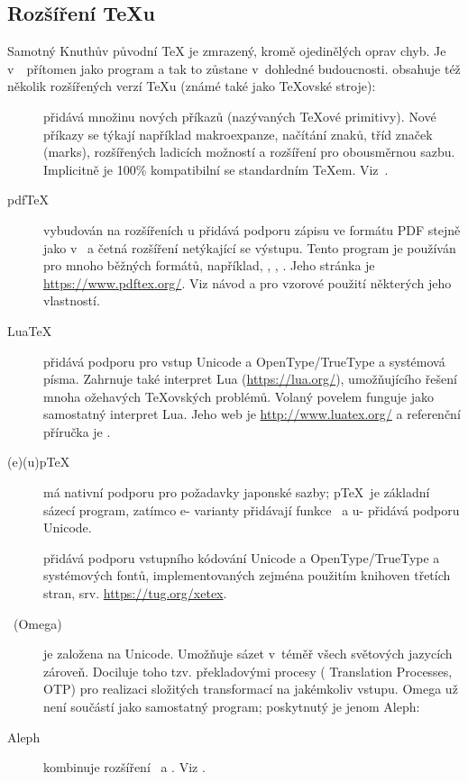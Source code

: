 \documentclass[\classoptions,slovak,english,czech]{\classname}
\begin{document}
\subsection{Rozšíření \protect\TeX{}u}
\label{sec:tex-extensions}

Samotný Knuthův původní \TeX{} je zmrazený, kromě ojedinělých oprav chyb.
Je v~\TL\ přítomen jako program  a tak to zůstane
v~dohledné budoucnosti. \TL{} obsahuje též několik rozšířených verzí 
\TeX{}u (známé také jako \TeX{}ovské stroje):

\begin{description}

\item [\eTeX] přidává množinu nových
příkazů (nazývaných \TeX{}ové primitivy).
\label{text:etex}
Nové příkazy se týkají například makroexpanze, načítání znaků,
tříd značek (marks), rozšířených ladicích možností
a rozšíření \TeXXeT{} pro obousměrnou sazbu. Implicitně
je \eTeX{} 100\% kompatibilní se standardním \TeX{}em.
Viz~. 

\item [pdf\TeX] vybudován na rozšířeních \eTeX{}u přidává podporu 
zápisu ve formátu PDF stejně jako v~\dvi{} a 
četná rozšíření netýkající se výstupu. 
Tento program je používán pro mnoho běžných formátů, 
například, , , .
Jeho stránka je \url{https://www.pdftex.org/}. Viz 
návod 
a 
pro vzorové použití některých jeho vlastností.  

\item [Lua\TeX] přidává podporu pro vstup Unicode a OpenType\slash TrueType
a systémová písma. Zahrnuje také interpret Lua
(\url{https://lua.org/}), umožňujícího řešení mnoha ožehavých \TeX ovských
problémů. Volaný povelem  funguje jako samostatný
interpret Lua. Jeho web je \url{http://www.luatex.org/} a
referenční příručka je . 

\item [(e)(u)p\TeX] má nativní podporu pro požadavky japonské sazby; 
p\TeX\ je základní sázecí program, zatímco e- varianty přidávají funkce \eTeX\ a u- přidává podporu Unicode. 

\item [\XeTeX] přidává podporu vstupního kódování
Unicode a OpenType\slash TrueType a systémových fontů, implementovaných
zejména použitím knihoven třetích stran, srv. \url{https://tug.org/xetex}.

\item [\OMEGA\ (Omega)] je založena na Unicode.  
Umožňuje sázet v~téměř všech světových jazycích zároveň.
Dociluje toho tzv. překladovými procesy (\OMEGA{} Translation
Processes, OTP) pro realizaci složitých transformací na jakémkoliv vstupu. 
Omega už není součástí \TL{} jako samostatný program;
poskytnutý je jenom Aleph:

\item [Aleph] kombinuje rozšíření \OMEGA\ a \eTeX.  
Viz .
\end{description}
\end{document}
